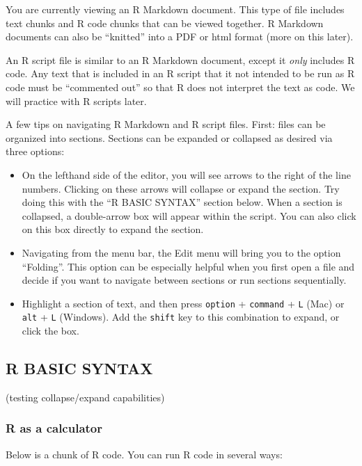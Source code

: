\documentclass[]{article}
\begin{document}
You are currently viewing an R Markdown document. This type of file
includes text chunks and R code chunks that can be viewed together. R
Markdown documents can also be ``knitted'' into a PDF or html format
(more on this later).

An R script file is similar to an R Markdown document, except it
\emph{only} includes R code. Any text that is included in an R script
that it not intended to be run as R code must be ``commented out'' so
that R does not interpret the text as code. We will practice with R
scripts later.

A few tips on navigating R Markdown and R script files. First: files can
be organized into sections. Sections can be expanded or collapsed as
desired via three options:

\begin{itemize}
\item
  On the lefthand side of the editor, you will see arrows to the right
  of the line numbers. Clicking on these arrows will collapse or expand
  the section. Try doing this with the ``R BASIC SYNTAX'' section below.
  When a section is collapsed, a double-arrow box will appear within the
  script. You can also click on this box directly to expand the section.
\item
  Navigating from the menu bar, the Edit menu will bring you to the
  option ``Folding''. This option can be especially helpful when you
  first open a file and decide if you want to navigate between sections
  or run sections sequentially.
\item
  Highlight a section of text, and then press \texttt{option} +
  \texttt{command} + \texttt{L} (Mac) or \texttt{alt} + \texttt{L}
  (Windows). Add the \texttt{shift} key to this combination to expand,
  or click the box.
\end{itemize}

\subsection{R BASIC SYNTAX}\label{r-basic-syntax}

(testing collapse/expand capabilities)

\subsubsection{R as a calculator}\label{r-as-a-calculator}

Below is a chunk of R code. You can run R code in several ways:
\end{document}
